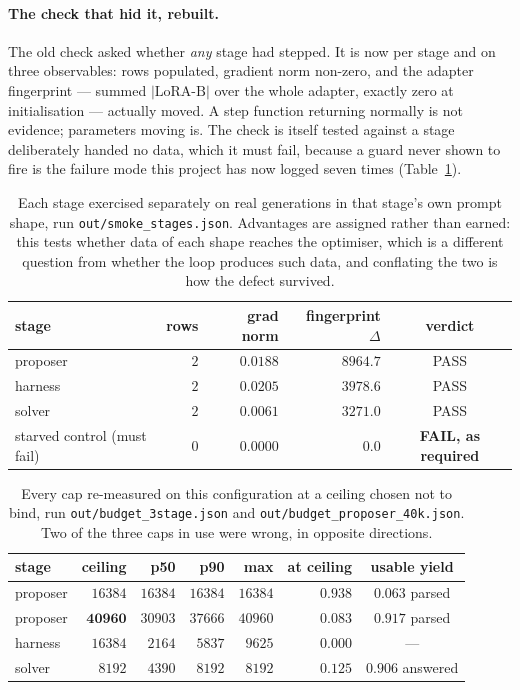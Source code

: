 \paragraph{The check that hid it, rebuilt.} The old check asked whether \emph{any} stage had
stepped. It is now per stage and on three observables: rows populated, gradient norm non-zero,
and the adapter fingerprint --- summed $|\text{LoRA-B}|$ over the whole adapter, exactly zero
at initialisation --- actually moved. A step function returning normally is not evidence;
parameters moving is. The check is itself tested against a stage deliberately handed no data,
which it must fail, because a guard never shown to fire is the failure mode this project has
now logged seven times (Table~\ref{tab:stagesmoke}).

\begin{table}[t]
\centering\small
\caption{Each stage exercised separately on real generations in that stage's own prompt shape,
run \texttt{out/smoke\_stages.json}. Advantages are assigned rather than earned: this tests
whether data of each shape reaches the optimiser, which is a different question from whether
the loop produces such data, and conflating the two is how the defect survived.}
\label{tab:stagesmoke}
\begin{tabular}{lrrrc}
\toprule
stage & rows & grad norm & fingerprint $\Delta$ & verdict \\
\midrule
proposer & $2$ & $0.0188$ & $8964.7$ & PASS \\
harness  & $2$ & $0.0205$ & $3978.6$ & PASS \\
solver   & $2$ & $0.0061$ & $3271.0$ & PASS \\
\midrule
starved control (must fail) & $0$ & $0.0000$ & $0.0$ & \textbf{FAIL, as required} \\
\bottomrule
\end{tabular}
\end{table}

\begin{table}[t]
\centering\small
\caption{Every cap re-measured on this configuration at a ceiling chosen not to bind, run
\texttt{out/budget\_3stage.json} and \texttt{out/budget\_proposer\_40k.json}. Two of the three
caps in use were wrong, in opposite directions.}
\label{tab:budget3}
\begin{tabular}{lrrrrrc}
\toprule
stage & ceiling & p50 & p90 & max & at ceiling & usable yield \\
\midrule
proposer & $16384$ & $16384$ & $16384$ & $16384$ & $0.938$ & $0.063$ parsed \\
proposer & $\mathbf{40960}$ & $30903$ & $37666$ & $40960$ & $0.083$ & $\mathbf{0.917}$ parsed \\
harness  & $16384$ & $2164$ & $5837$ & $9625$ & $0.000$ & --- \\
solver   & $8192$ & $4390$ & $8192$ & $8192$ & $0.125$ & $0.906$ answered \\
\bottomrule
\end{tabular}
\end{table}

